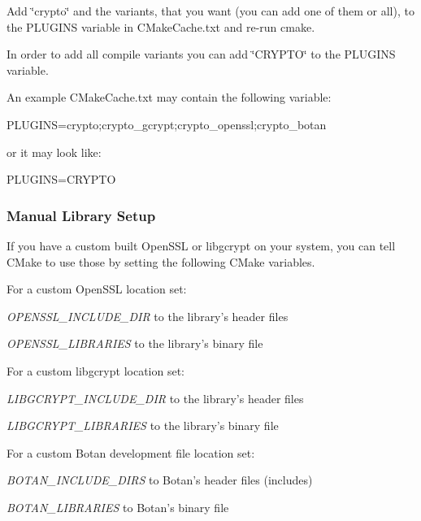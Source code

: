 Add \char`\"{}crypto\char`\"{} and the variants, that you want (you can add one of them or all), to the {\ttfamily P\+L\+U\+G\+I\+N\+S} variable in {\ttfamily C\+Make\+Cache.\+txt} and re-\/run {\ttfamily cmake}.

In order to add all compile variants you can add \char`\"{}\+C\+R\+Y\+P\+T\+O\char`\"{} to the {\ttfamily P\+L\+U\+G\+I\+N\+S} variable.

An example {\ttfamily C\+Make\+Cache.\+txt} may contain the following variable\+: \begin{DoxyVerb}PLUGINS=crypto;crypto_gcrypt;crypto_openssl;crypto_botan
\end{DoxyVerb}


or it may look like\+: \begin{DoxyVerb}PLUGINS=CRYPTO
\end{DoxyVerb}


\subsubsection*{Manual Library Setup}

If you have a custom built Open\+S\+S\+L or libgcrypt on your system, you can tell C\+Make to use those by setting the following C\+Make variables.

For a custom Open\+S\+S\+L location set\+:


\begin{DoxyItemize}
\item {\itshape O\+P\+E\+N\+S\+S\+L\+\_\+\+I\+N\+C\+L\+U\+D\+E\+\_\+\+D\+I\+R} to the library's header files
\item {\itshape O\+P\+E\+N\+S\+S\+L\+\_\+\+L\+I\+B\+R\+A\+R\+I\+E\+S} to the library's binary file
\end{DoxyItemize}

For a custom libgcrypt location set\+:


\begin{DoxyItemize}
\item {\itshape L\+I\+B\+G\+C\+R\+Y\+P\+T\+\_\+\+I\+N\+C\+L\+U\+D\+E\+\_\+\+D\+I\+R} to the library's header files
\item {\itshape L\+I\+B\+G\+C\+R\+Y\+P\+T\+\_\+\+L\+I\+B\+R\+A\+R\+I\+E\+S} to the library's binary file
\end{DoxyItemize}

For a custom Botan development file location set\+:


\begin{DoxyItemize}
\item {\itshape B\+O\+T\+A\+N\+\_\+\+I\+N\+C\+L\+U\+D\+E\+\_\+\+D\+I\+R\+S} to Botan's header files (includes)
\item {\itshape B\+O\+T\+A\+N\+\_\+\+L\+I\+B\+R\+A\+R\+I\+E\+S} to Botan's binary file
\end{DoxyItemize}

